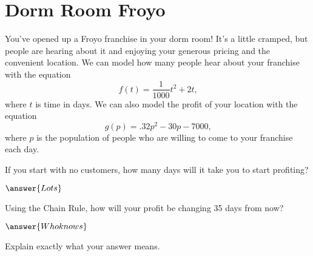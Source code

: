 \documentclass{ximera}
\begin{document}
\section{Dorm Room Froyo}
You've opened up a Froyo franchise in your dorm room! It's a little cramped, but people are hearing about it and enjoying your generous pricing and the convenient location. We can model how many people hear about your franchise with the equation $$f(t) = \frac{1}{1000}t^2 + 2t \text{,}$$ where $t$ is time in days. We can also model the profit of your location with the equation $$g(p) = .32p^2 - 30p - 7000 \text{,}$$ where $p$ is the population of people who are willing to come to your franchise each day.
\begin{question}
If you start with no customers, how many days will it take you to start profiting?

$\answer{Lots}$

Using the Chain Rule, how will your profit be changing 35 days from now?

$\answer{Who knows}$

Explain exactly what your answer means.
\begin{freeResponse}
\end{freeResponse}
\end{question}
\end{document}
